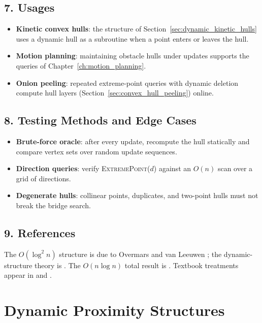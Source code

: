 \subsection{7. Usages}

\begin{itemize}
  \item \textbf{Kinetic convex hulls}: the structure of
    Section~\ref{sec:dynamic_kinetic_hulls} uses a dynamic hull as a
    subroutine when a point enters or leaves the hull.
  \item \textbf{Motion planning}: maintaining obstacle hulls under updates
    supports the queries of Chapter~\ref{ch:motion_planning}.
  \item \textbf{Onion peeling}: repeated extreme-point queries with dynamic
    deletion compute hull layers (Section~\ref{sec:convex_hull_peeling})
    online.
\end{itemize}

\subsection{8. Testing Methods and Edge Cases}

\begin{itemize}
  \item \textbf{Brute-force oracle}: after every update, recompute the hull
    statically and compare vertex sets over random update sequences.
  \item \textbf{Direction queries}: verify \textsc{ExtremePoint}($d$) against
    an $O(n)$ scan over a grid of directions.
  \item \textbf{Degenerate hulls}: collinear points, duplicates, and
    two-point hulls must not break the bridge search.
\end{itemize}

\subsection{9. References}

The $O(\log^2 n)$ structure is due to Overmars and van Leeuwen
\cite{overmars1981}; the dynamic-structure theory is \cite{overmars1983}.
The $O(n\log n)$ total result is \cite{brodal2002}. Textbook treatments
appear in \cite{berg2008,preparata1985} and \cite{mehta2005}.

\section{Dynamic Proximity Structures}
\label{sec:dynamic_proximity}

